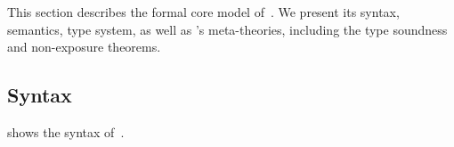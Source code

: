 

This section describes the formal core model of~\systemname.
We present its syntax, semantics, type system,
as well as \systemname’s meta-theories, including the type soundness and non-exposure theorems.


\subsection{Syntax}\label{sec:syntax}
 shows the syntax of~\systemname.

